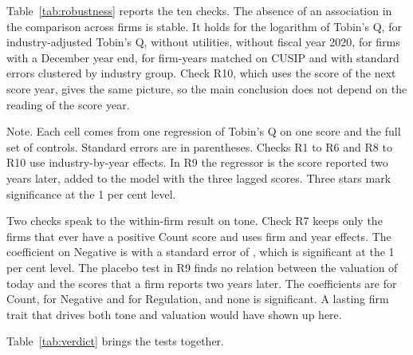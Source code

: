 \documentclass[12pt,a4paper]{article}
\newcommand{\tablenote}[1]{\par\smallskip\begin{minipage}{\linewidth}\footnotesize\setstretch{1.05}#1\end{minipage}}
\newcommand{\widetable}[1]{\resizebox{\ifdim\width>\linewidth\linewidth\else\width\fi}{!}{}}
\begin{document}
Table~\ref{tab:robustness} reports the ten checks. The absence of an association in the comparison across firms is stable. It holds for the logarithm of Tobin's Q, for industry-adjusted Tobin's Q, without utilities, without fiscal year 2020, for firms with a December year end, for firm-years matched on CUSIP and with standard errors clustered by industry group. Check R10, which uses the score of the next score year, gives the same picture, so the main conclusion does not depend on the reading of the score year.

\begin{table}[!htbp]
\centering\small
\caption{Robustness checks}\label{tab:robustness}
\widetable{tables/tab_robustness}
\tablenote{Note. Each cell comes from one regression of Tobin's Q on one score and the full set of controls. Standard errors are in parentheses. Checks R1 to R6 and R8 to R10 use industry-by-year effects. In R9 the regressor is the score reported two years later, added to the model with the three lagged scores. Three stars mark significance at the 1 per cent level.}
\end{table}

Two checks speak to the within-firm result on tone. Check R7 keeps only the \nFirmsRSeven{} firms that ever have a positive Count score and uses firm and year effects. The coefficient on Negative is \coefRSevenNeg{} with a standard error of \seRSevenNeg{}, which is significant at the 1 per cent level. The placebo test in R9 finds no relation between the valuation of today and the scores that a firm reports two years later. The coefficients are \coefRNineCount{} for Count, \coefRNineNeg{} for Negative and \coefRNineReg{} for Regulation, and none is significant. A lasting firm trait that drives both tone and valuation would have shown up here.

Table~\ref{tab:verdict} brings the tests together.
\end{document}
